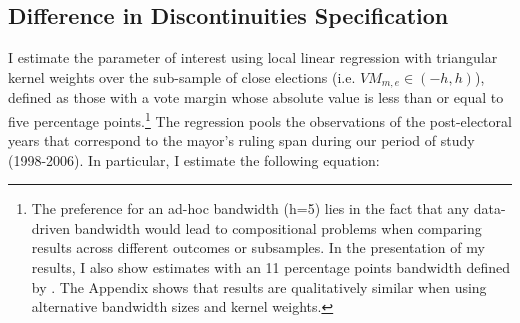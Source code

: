 \documentclass[dv_diss_main.tex]{subfiles}
\begin{document}
\subsection{Difference in Discontinuities Specification}
I estimate the parameter of interest using local linear regression \citep{gelman2019high} with triangular kernel weights \citep{calonico2020optimal} over the sub-sample of close elections (i.e. $VM_{m,e} \in (-h, h)$), defined as those with a  vote margin whose absolute value is less than or equal to five percentage points.\footnote{ The preference for an ad-hoc bandwidth (h=5) lies in the fact that any data-driven bandwidth \citep{calonico2020optimal} would lead to compositional problems when comparing results across different outcomes or subsamples. In the presentation of my results, I also show estimates with an 11 percentage points bandwidth defined by \cite{calonico2020optimal}. The Appendix shows that results are qualitatively similar when using alternative bandwidth sizes and kernel weights.} The regression pools the observations of the post-electoral years that correspond to the mayor's ruling span during our period of study (1998-2006). In particular, I estimate the following equation: 
\end{document}
